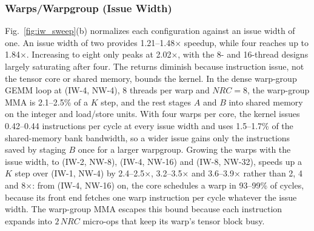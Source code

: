 \subsubsection{Warps/Warpgroup (Issue Width)}\label{sec:eval_iw}
Fig.~\ref{fig:iw_sweep}(b) normalizes each configuration against an issue
width of one. An issue width of two provides 1.21--1.48$\times$ speedup,
while four reaches up to 1.84$\times$. Increasing to eight only peaks at 2.02$\times$, with the 8- and 16-thread designs largely saturating after
four. The returns diminish because instruction issue, not the tensor core or shared memory, bounds the kernel. In the dense warp-group GEMM loop at (IW-4, NW-4), 8 threads per warp and $\mathit{NRC}{=}8$, the warp-group MMA is 2.1--2.5\% of a $K$ step, and the rest stages $A$ and $B$ into shared memory on the integer and load/store units. With four warps per core, the kernel issues 0.42--0.44 instructions per cycle at every issue width and uses 1.5--1.7\% of the shared-memory bank bandwidth, so a wider issue gains only the instructions saved by staging $B$ once for a larger warpgroup. Growing the warps with the issue width, to (IW-2, NW-8), (IW-4, NW-16) and (IW-8, NW-32), speeds up a $K$ step over (IW-1, NW-4) by 2.4--2.5$\times$, 3.2--3.5$\times$ and 3.6--3.9$\times$ rather than 2, 4 and 8$\times$: from (IW-4, NW-16) on, the core schedules a warp in 93--99\% of cycles, because its front end fetches one warp instruction per cycle whatever the issue width. The warp-group MMA escapes this bound because each instruction expands into $2\,\mathit{NRC}$ micro-ops that keep its warp's tensor block busy.

